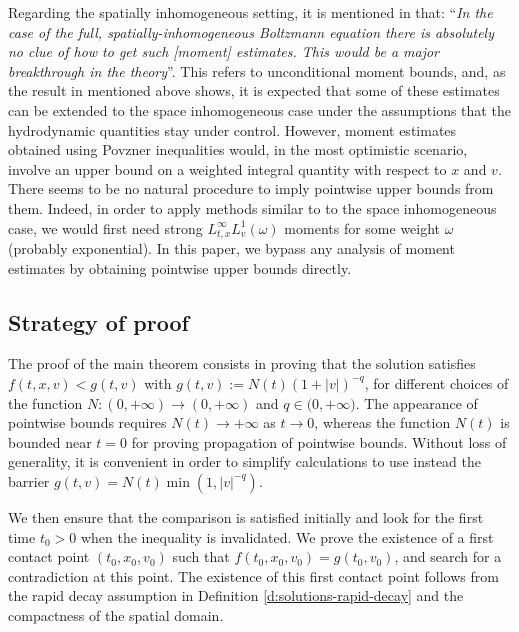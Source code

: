 \documentclass[11pt]{article}
\theoremstyle{plain}
\theoremstyle{definition}
\numberwithin{equation}{section}
\let\A N
\begin{document}
Regarding the spatially inhomogeneous setting, it is mentioned in
\cite[Chap.\,2, \S2]{villani-book} that: ``\textit{In the case
of the full, spatially-inhomogeneous Boltzmann equation there is
absolutely no clue of how to get such [moment] estimates. This would
be a major breakthrough in the theory}''. This refers to
unconditional moment bounds, and, as the result in
\cite[\S 5]{GMM} mentioned above shows, it is expected that some
of these estimates can be extended to the space inhomogeneous case
under the assumptions that the hydrodynamic quantities stay under
control. However, moment estimates obtained using Povzner inequalities
would, in the most optimistic scenario, involve an upper bound on a
weighted integral quantity with respect to $x$ and $v$. There seems to
be no natural procedure to imply pointwise upper bounds from
them. Indeed, in order to apply methods similar to
\cite{gamba-panferov-villani-2009,bobylev2017upper,gamba2017pointwise}
to the space inhomogeneous case, we would first need strong
$L^\infty_{t,x} L^1_v(\omega)$ moments for some weight $\omega$
(probably exponential). In this paper, we bypass any analysis of
moment estimates by obtaining pointwise upper bounds directly.

\subsection{Strategy of proof}

The proof of the main theorem consists in proving that the solution
satisfies $f(t,x,v) < g(t,v)$ with $g(t,v) := \A(t) (1 + |v|)^{-q}$,
for different choices of the function
$\A: (0,+\infty) \to (0,+\infty)$ and $q \in \mathbb (0,+\infty)$. The
appearance of pointwise bounds requires $\A(t) \to +\infty$ as
$t \to 0$, whereas the function $\A(t)$ is bounded near $t=0$ for
proving propagation of pointwise bounds. Without loss of generality,
it is convenient in order to simplify calculations to use instead the
barrier $g(t,v) = N(t) \min(1,|v|^{-q})$.

We then ensure that the comparison is satisfied initially and look for
the first time $t_0 >0$ when the inequality is invalidated. We prove
the existence of a first contact point $(t_0,x_0,v_0)$ such that
$f(t_0,x_0,v_0) = g(t_0,v_0)$, and search for a
contradiction at this point. The existence of this first contact point
follows from the rapid decay assumption in Definition
\ref{d:solutions-rapid-decay} and the compactness of the spatial domain.
\end{document}
